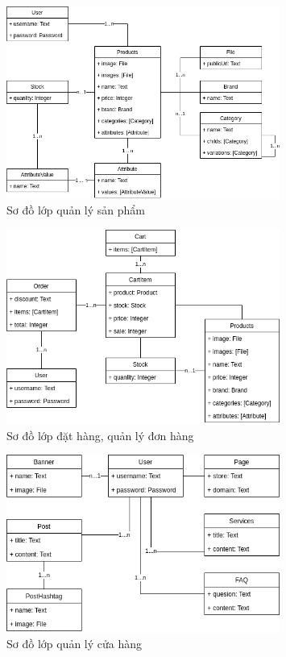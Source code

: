 \documentclass[11pt]{report}
\begin{document}
\FloatBarrier
\begin{figure}[!htbp]
	\centering
	\includegraphics[width=0.8\textwidth]{class-products}
	\caption{Sơ đồ lớp quản lý sản phẩm}
\end{figure}

\clearpage
\FloatBarrier
\begin{figure}[!htbp]
	\centering
	\includegraphics[width=0.8\textwidth]{class-orders}
	\caption{Sơ đồ lớp đặt hàng, quản lý đơn hàng}
\end{figure}
\FloatBarrier
\begin{figure}[!htbp]
	\centering
	\includegraphics[width=0.8\textwidth]{class-store}
	\caption{Sơ đồ lớp quản lý cửa hàng}
\end{figure}
\end{document}
